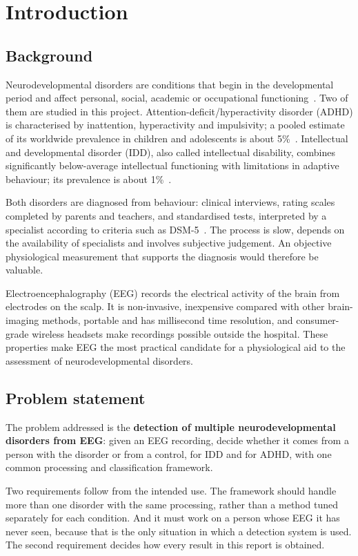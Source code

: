 \chapter{Introduction}
\thispagestyle{empty}

\section{Background}
Neurodevelopmental disorders are conditions that begin in the developmental period and affect
personal, social, academic or occupational functioning~\cite{apa2013}. Two of them are studied
in this project. Attention-deficit/hyperactivity disorder (ADHD) is characterised by
inattention, hyperactivity and impulsivity; a pooled estimate of its worldwide prevalence in
children and adolescents is about 5\%~\cite{polanczyk2007}. Intellectual and developmental
disorder (IDD), also called intellectual disability, combines significantly below-average
intellectual functioning with limitations in adaptive behaviour; its prevalence is about
1\%~\cite{maulik2011}.

Both disorders are diagnosed from behaviour: clinical interviews, rating scales completed by
parents and teachers, and standardised tests, interpreted by a specialist according to criteria
such as DSM-5~\cite{apa2013}. The process is slow, depends on the availability of specialists
and involves subjective judgement. An objective physiological measurement that supports the
diagnosis would therefore be valuable.

Electroencephalography (EEG) records the electrical activity of the brain from electrodes on
the scalp. It is non-invasive, inexpensive compared with other brain-imaging methods, portable
and has millisecond time resolution, and consumer-grade wireless headsets make recordings
possible outside the hospital. These properties make EEG the most practical candidate for a
physiological aid to the assessment of neurodevelopmental disorders.

\section{Problem statement}
The problem addressed is the \textbf{detection of multiple neurodevelopmental disorders from
EEG}: given an EEG recording, decide whether it comes from a person with the disorder or from a
control, for IDD and for ADHD, with one common processing and classification framework.

Two requirements follow from the intended use. The framework should handle more than one
disorder with the same processing, rather than a method tuned separately for each condition. And
it must work on a person whose EEG it has never seen, because that is the only situation in
which a detection system is used. The second requirement decides how every result in this
report is obtained.

